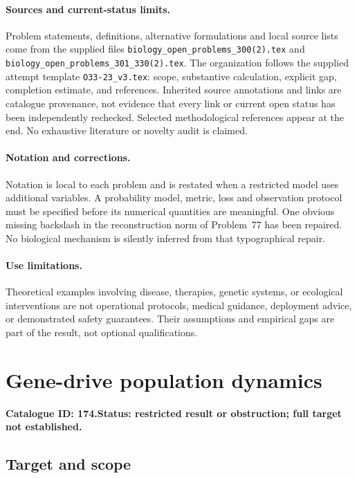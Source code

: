 \documentclass[11pt]{article}
\begin{document}
\paragraph{Sources and current-status limits.}
Problem statements, definitions, alternative formulations and local source lists
come from the supplied files
\texttt{biology\_open\_problems\_300(2).tex} and
\texttt{biology\_open\_problems\_301\_330(2).tex}.
The organization follows the supplied attempt template
\texttt{O33-23\_v3.tex}: scope, substantive calculation, explicit gap,
completion estimate, and references. Inherited source annotations and links are
catalogue provenance, not evidence that every link or current open status has
been independently rechecked. Selected methodological references appear at the
end. No exhaustive literature or novelty audit is claimed.

\paragraph{Notation and corrections.}
Notation is local to each problem and is restated when a restricted model uses
additional variables. A probability model, metric, loss and observation protocol
must be specified before its numerical quantities are meaningful. One obvious
missing backslash in the reconstruction norm of Problem~77 has been repaired.
No biological mechanism is silently inferred from that typographical repair.

\paragraph{Use limitations.}
Theoretical examples involving disease, therapies, genetic systems, or ecological
interventions are not operational protocols, medical guidance, deployment advice,
or demonstrated safety guarantees. Their assumptions and empirical gaps are part
of the result, not optional qualifications.

\setcounter{section}{173}
\section{Gene-drive population dynamics}
\label{prob:174}
\noindent\textbf{Catalogue ID: 174.}\quad \textbf{Status: restricted result or obstruction; full target not established.}
\subsection{Target and scope}
\end{document}
